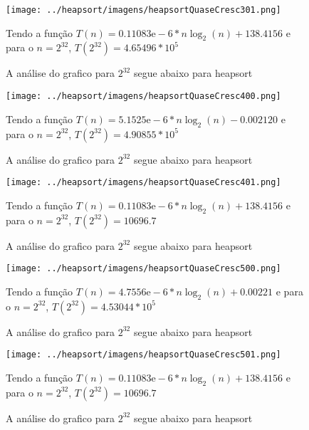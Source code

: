 \documentclass[12pt,a4paper,twoside]{report}
\begin{document}
\begin{figure}[ht]
\centering \texttt{[image: ../heapsort/imagens/heapsortQuaseCresc301.png]}
\caption{A análise do grafico para $2^{32}$ segue abaixo para heapsort}

Tendo a função $T(n) = 0.11083\mathrm{e}-6*n\log_{2}(n)+138.4156$ e para o $n =2^{32}$, $T(2^{32}) = 4.65496*10^{5}$
\label{fig:heapsortQuaseCresc301}
\end{figure}




\begin{figure}[ht]
\centering \texttt{[image: ../heapsort/imagens/heapsortQuaseCresc400.png]}
\caption{A análise do grafico para $2^{32}$ segue abaixo para heapsort}

Tendo a função $T(n) = 5.1525\mathrm{e}-6*n\log_{2}(n)-0.002120$ e para o $n =2^{32}$, $T(2^{32}) = 4.90855*10^5$
\label{fig:heapsortQuaseCresc400}
\end{figure}

\begin{figure}[ht]
\centering \texttt{[image: ../heapsort/imagens/heapsortQuaseCresc401.png]}
\caption{A análise do grafico para $2^{32}$ segue abaixo para heapsort}

Tendo a função $T(n) = 0.11083\mathrm{e}-6*n\log_{2}(n)+138.4156$ e para o $n =2^{32}$, $T(2^{32}) = 10696.7$
\label{fig:heapsortQuaseCresc401}
\end{figure}




\begin{figure}[ht]
\centering \texttt{[image: ../heapsort/imagens/heapsortQuaseCresc500.png]}
\caption{A análise do grafico para $2^{32}$ segue abaixo para heapsort}

Tendo a função $T(n) = 4.7556\mathrm{e}-6*n\log_{2}(n)+0.00221$ e para o $n =2^{32}$, $T(2^{32}) = 4.53044*10^{5}$
\label{fig:heapsortQuaseCresc500}
\end{figure}

\begin{figure}[ht]
\centering \texttt{[image: ../heapsort/imagens/heapsortQuaseCresc501.png]}
\caption{A análise do grafico para $2^{32}$ segue abaixo para heapsort}

Tendo a função $T(n) = 0.11083\mathrm{e}-6*n\log_{2}(n)+138.4156$ e para o $n =2^{32}$, $T(2^{32}) = 10696.7$
\label{fig:heapsortQuaseCresc501}
\end{figure}
\end{document}
